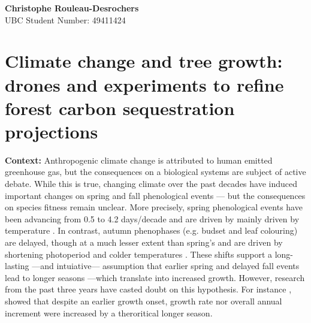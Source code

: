 \documentclass[12pt]{article}
\begin{document}
{\small
\textbf{Christophe Rouleau-Desrochers} \\
UBC Student Number: 49411424
}
\vspace{0cm}

\section*{Climate change and tree growth: drones and experiments to refine forest carbon sequestration projections}



\textbf {Context:} Anthropogenic climate change is attributed to human emitted greenhouse gas, but the consequences on a biological systems are subject of active debate. While this is true, changing climate over the past decades have induced important changes on spring and fall phenological events --- but the consequences on species fitness remain unclear. More precisely, spring phenological events have been advancing from 0.5 \citep{wolfe_climate_2005} to 4.2 days/decade \citep{chmielewski_response_2001,fu_recent_2014} and are driven by mainly driven by temperature \citep{chuine_why_2010,cleland_shifting_2007,penuelas_responses_2001}. In contrast, autumn phenophases (e.g. budset and leaf colouring) are delayed, though at a much lesser extent than spring's \citep{gallinat_autumn_2015,jeong_macroscale_2014} and are driven by shortening photoperiod \citep{cooke_dynamic_2012,flynn_temperature_2018,korner_phenology_2010} and colder temperatures \citep{cooke_dynamic_2012,delpierre_temperate_2016}. These shifts support a long-lasting ---and intuiative---  assumption that earlier spring and delayed fall events lead to longer seasons ---which translate into increased growth. However, research from the past three years have casted doubt on this hypothesis. For instance \citep{dow_warm_2022}, showed that despite an earlier growth onset, growth rate nor overall annual increment were increased by a theroritical longer season. 
\end{document}

